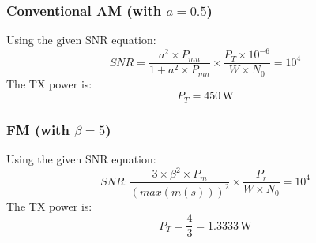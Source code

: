 \documentclass{article}
\begin{document}
\subsubsection*{Conventional AM (with \( a = 0.5 \))}
Using the given SNR equation:
\[ SNR = \frac{a^2 \times P_{mn}}{1 + a^2 \times P_{mn}} \times \frac{P_T \times 10^{-6}}{W \times N_0} = 10^4 \]
The TX power is:
\[ P_T = 450 \, \text{W} \]

\subsubsection*{FM (with \( \beta = 5 \))}
Using the given SNR equation:
\[ SNR: \frac{3 \times \beta^2 \times P_m}{(max(m(s)))^2} \times \frac{P_r}{W \times N_0} = 10^4 \]
The TX power is:
\[ P_T = \frac{4}{3} = 1.3333 \, \text{W} \]
\end{document}
